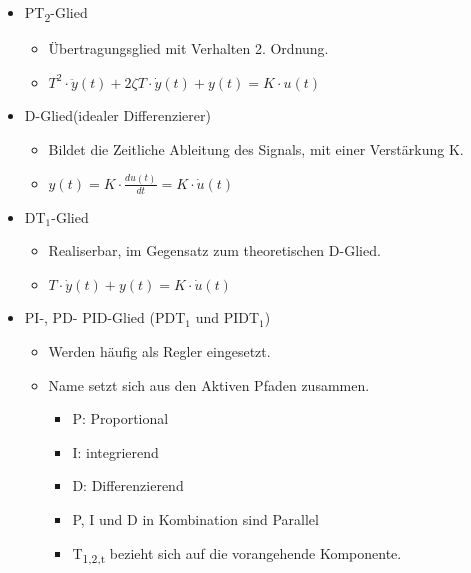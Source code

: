 \documentclass[margin=normal]{tex/hsrzf}
\begin{document}
\begin{itemize}
\begin{itemize}
                  \item PT\textsubscript{2}-Glied
                        \begin{itemize}
                              \item Übertragungsglied mit Verhalten 2. Ordnung.
                              \item $T^2 \cdot \ddot{y}(t) + 2 \zeta T \cdot\dot{y}(t) + y(t) = K \cdot u(t)$
                        \end{itemize}
                  \item D-Glied(idealer Differenzierer)
                        \begin{itemize}
                              \item Bildet die Zeitliche Ableitung des Signals, mit einer Verstärkung K.
                              \item $y(t) = K \cdot \frac{du(t)}{dt} = K\cdot \dot{u}(t)$
                        \end{itemize}
                  \item DT$_1$-Glied
                        \begin{itemize}
                              \item Realiserbar, im Gegensatz zum theoretischen D-Glied.
                              \item $T \cdot \dot{y}(t) + y(t) = K \cdot \dot{u}(t)$
                        \end{itemize}
                  \item PI-, PD- PID-Glied (PDT$_1$ und PIDT$_1$)
                        \begin{itemize}
                              \item Werden häufig als Regler eingesetzt.
                              \item Name setzt sich aus den Aktiven Pfaden zusammen.
                                    \begin{itemize}
                                          \item P: Proportional
                                          \item I: integrierend
                                          \item D: Differenzierend
                                          \item P, I und D in Kombination sind Parallel
                                          \item T\textsubscript{1,2,t} bezieht sich auf die vorangehende Komponente.

\end{itemize}
\end{itemize}
\end{itemize}
\end{itemize}
\end{document}
